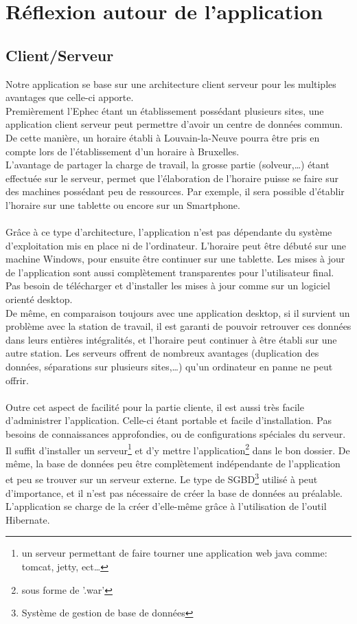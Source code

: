 \section{Réflexion autour de l'application}

\subsection{Client/Serveur}
Notre application se base sur une architecture client serveur pour les multiples
avantages que celle-ci apporte.\\
Premièrement l'Ephec étant un établissement possédant plusieurs sites,
 une application client serveur peut permettre d'avoir un centre de données
 commun.
 De cette manière, un horaire établi à Louvain-la-Neuve pourra être pris en
 compte lors de l'établissement d'un horaire à Bruxelles.\\
L'avantage de partager la charge de travail, la grosse partie (solveur,…) étant
effectuée sur le serveur, permet que l'élaboration de l'horaire puisse se
faire sur des machines possédant peu de ressources. Par exemple, il sera
possible d'établir l'horaire sur une tablette ou encore sur un Smartphone.\\
\\
Grâce à ce type d'architecture, l'application n'est pas dépendante du système
d'exploitation mis en place ni de l'ordinateur. L'horaire peut être débuté sur
une machine Windows, pour ensuite être continuer sur une tablette.
Les mises à jour de l'application sont aussi complètement transparentes pour
l'utilisateur final. Pas besoin de télécharger et d'installer les mises à jour
comme sur un logiciel orienté desktop.\\
De même, en comparaison toujours avec une application desktop, si il survient un
problème avec la station de travail, il est garanti de pouvoir retrouver ces
données dans leurs entières intégralités, et l'horaire peut continuer à être établi
sur une autre station. Les serveurs offrent de nombreux avantages (duplication des
données, séparations sur plusieurs sites,…) qu'un ordinateur en panne ne peut offrir.\\
\\
Outre cet aspect de facilité pour la partie cliente, il est aussi très facile
d'administrer l'application. Celle-ci étant portable et facile d'installation.
Pas besoins de connaissances approfondies, ou de configurations spéciales du
serveur. Il suffit d'installer un serveur\footnote{un serveur permettant
de faire tourner une application web java comme: tomcat, jetty, ect…} et d'y
mettre l'application\footnote{sous forme de '.war'} dans le bon dossier.
De même, la base de données peu être complètement indépendante de l'application
et peu se trouver sur un serveur externe.
Le type de SGBD\footnote{Système de gestion de base de données} utilisé à peut d'importance, et il n'est pas nécessaire de créer
la base de données au préalable. L'application se charge de la créer d'elle-même
grâce à l'utilisation de l'outil Hibernate.

